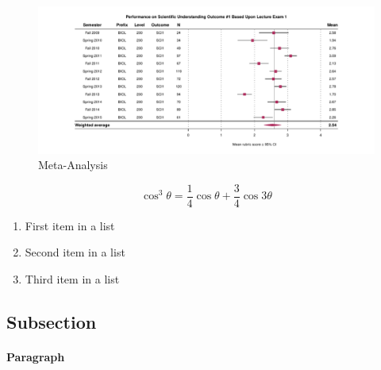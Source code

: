 \documentclass[fleqn,10pt]{SelfArx}\usepackage[]{graphicx}\usepackage[]{color}
\begin{document}
\begin{figure}[ht]\centering %
\includegraphics[width=\linewidth]{forest}
\protect\caption{Meta-Analysis}
\label{fig:forest.pdf}
\end{figure}

\lipsum[1] %


\lipsum[1] %

\begin{equation}
\cos^3 \theta =\frac{1}{4}\cos\theta+\frac{3}{4}\cos 3\theta
\label{eq:refname2}
\end{equation}

\lipsum[1] %

\begin{enumerate}[noitemsep] %
\item First item in a list
\item Second item in a list
\item Third item in a list
\end{enumerate}

\subsection{Subsection}
\lipsum[1] %
\paragraph{Paragraph} \lipsum[1] %
\end{document}
